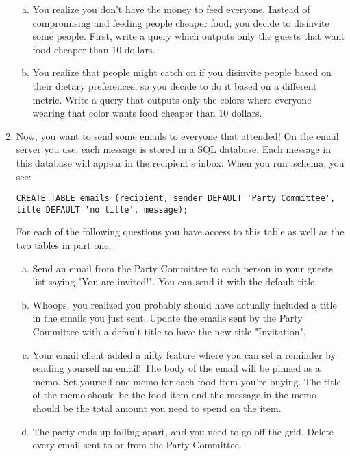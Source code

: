 \documentclass{exam}
\begin{document}
\begin{enumerate}[1)]
\begin{enumerate}[a.]
\item You realize you don’t have the money to feed everyone. Instead of compromising and feeding people cheaper food, you decide to disinvite some people. First, write a query which outputs only the guests that want food cheaper than 10 dollars. 
\vspace{2cm}
\item You realize that people might catch on if you disinvite people based on their dietary preferences, so you decide to do it based on a different metric. Write a query that outputs only the colors where everyone wearing that color wants food cheaper than 10 dollars.
\vspace{2cm}

\end{enumerate}
\newpage
\item Now, you want to send some emails to everyone that attended! On the email server you use, each message is stored in a SQL database. Each message in this database will appear in the recipient’s inbox. When you run .schema, you see:
\begin{lstlisting}
CREATE TABLE emails (recipient, sender DEFAULT 'Party Committee', title DEFAULT 'no title', message);
\end{lstlisting}
For each of the following questions you have access to this table as well as the two tables in part one.
\begin{enumerate}[a.]
\item Send an email from the Party Committee to each person in your guests list saying "You are invited!". You can send it with the default title.
\vspace{2cm}
\item Whoops, you realized you probably should have actually included a title in the emails you just sent. Update the emails sent by the Party Committee with a default title to have the new title "Invitation".
\vspace{2cm}
\item Your email client added a nifty feature where you can set a reminder by sending yourself an email! The body of the email will be pinned as a memo.
\newline
Set yourself one memo for each food item you're buying. The title of the memo should be the food item and the message in the memo should be the total amount you need to spend on the item.
\vspace{2cm}
\item The party ends up falling apart, and you need to go off the grid. Delete every email sent to or from the Party Committee.
\vspace{2cm}
\end{enumerate}
\end{enumerate}
\end{document}
